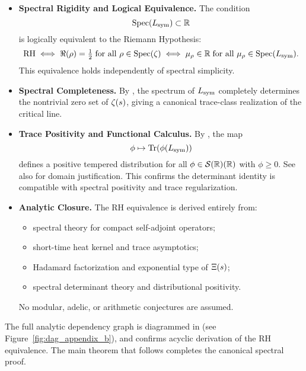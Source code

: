 \begin{itemize}
  \item \textbf{Spectral Rigidity and Logical Equivalence.}  
  The condition
  \[
  \operatorname{Spec}(L_{\mathrm{sym}}) \subset \mathbb{R}
  \]
  is logically equivalent to the Riemann Hypothesis:
  \[
  \mathrm{RH} \iff \Re(\rho) = \tfrac{1}{2} \;\text{for all } \rho \in \operatorname{Spec}(\zeta)
       \iff \mu_\rho \in \mathbb{R} \;\text{for all } \mu_\rho \in \operatorname{Spec}(L_{\mathrm{sym}}).
  \]
  This equivalence holds independently of spectral simplicity.

  \item \textbf{Spectral Completeness.}  
  By , the spectrum of \( L_{\mathrm{sym}} \) completely determines the nontrivial zero set of \( \zeta(s) \), giving a canonical trace-class realization of the critical line.

  \item \textbf{Trace Positivity and Functional Calculus.}  
  By , the map
  \[
  \phi \mapsto \operatorname{Tr}(\phi(L_{\mathrm{sym}}))
  \]
  defines a positive tempered distribution for all \( \phi \in \mathcal{S}(\mathbb{R})(\mathbb{R}) \) with \( \phi \ge 0 \). See also  for domain justification. This confirms the determinant identity is compatible with spectral positivity and trace regularization.

  \item \textbf{Analytic Closure.}  
  The RH equivalence is derived entirely from:
  \begin{itemize}
    \item spectral theory for compact self-adjoint operators;
    \item short-time heat kernel and trace asymptotics;
    \item Hadamard factorization and exponential type of \( \Xi(s) \);
    \item spectral determinant theory and distributional positivity.
  \end{itemize}
  No modular, adelic, or arithmetic conjectures are assumed.
\end{itemize}

\medskip
\noindent
The full analytic dependency graph is diagrammed in  (see Figure~\ref{fig:dag_appendix_b}), and confirms acyclic derivation of the RH equivalence. The main theorem that follows completes the canonical spectral proof.
